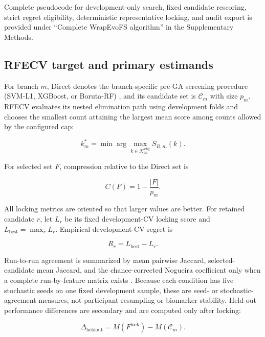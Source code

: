 Complete pseudocode for development-only search, fixed candidate rescoring, strict regret eligibility, deterministic representative locking, and audit export is provided under ``Complete WrapEvoFS algorithm'' in the Supplementary Methods.

\subsection{RFECV target and primary estimands}

For branch \(m\), Direct denotes the branch-specific pre-GA screening procedure (SVM-L1, XGBoost, or Boruta-RF) \citep{ref10,ref11,ref13}, and its candidate set is \(\mathcal C_m\) with size \(p_m\). RFECV evaluates its nested elimination path using development folds and chooses the smallest count attaining the largest mean score among counts allowed by the configured cap:

\begin{equation}
k_m^{\ast}=\min\!\arg\max_{k\in\mathcal K_m^{\mathrm{elig}}}\overline S_{R,m}(k).
\label{eq:rfecv-target}
\end{equation}

For selected set \(F\), compression relative to the Direct set is

\begin{equation}
C(F)=1-\frac{|F|}{p_m}.
\label{eq:compression}
\end{equation}

All locking metrics are oriented so that larger values are better. For retained candidate \(r\), let \(L_r\) be its fixed development-CV locking score and \(L_{\mathrm{best}}=\max_rL_r\). Empirical development-CV regret is

\begin{equation}
R_r=L_{\mathrm{best}}-L_r.
\label{eq:regret}
\end{equation}

Run-to-run agreement is summarized by mean pairwise Jaccard, selected-candidate mean Jaccard, and the chance-corrected Nogueira coefficient only when a complete run-by-feature matrix exists \citep{ref36}. Because each condition has five stochastic seeds on one fixed development sample, these are seed- or stochastic-agreement measures, not participant-resampling or biomarker stability. Held-out performance differences are secondary and are computed only after locking:

\begin{equation}
\Delta_{\mathrm{heldout}}=M(F^{\mathrm{lock}})-M(\mathcal C_m).
\label{eq:heldout-delta}
\end{equation}

